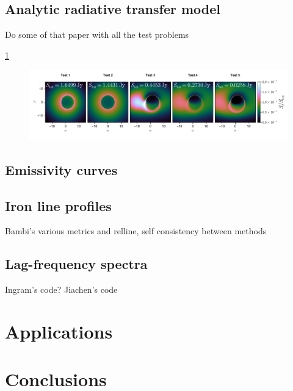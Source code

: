 \documentclass[fleqn,usenatbib]{mnras}
\begin{document}
\subsection{Analytic radiative transfer model}

Do some of that \citep{gold_verification_2020} paper with all the test problems

\ref{fig:gold-test-problems}

\begin{figure}
	\centering
	\includegraphics[width=0.97\linewidth]{figures/radiative-transfer.gold.pdf}
	\caption{}
	\label{fig:gold-test-problems}
\end{figure}

\subsection{Emissivity curves}


\subsection{Iron line profiles}

Bambi's various metrics and relline, self consistency between methods

\subsection{Lag-frequency spectra}

Ingram's code? Jiachen's code

\section{Applications}


\section{Conclusions}
\end{document}

